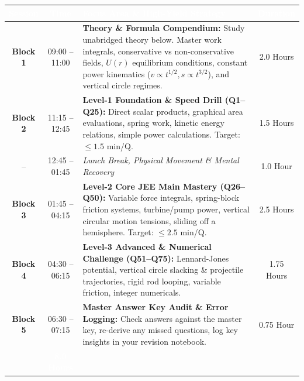 \documentclass[11pt,a4paper]{article}
\begin{document}
\begin{center}
\renewcommand{\arraystretch}{1.25}
\small
\begin{tabularx}{\textwidth}{|c|c|X|c|}
\hline
\rowcolor{tableDarkHeader}
\textcolor{white}{\textbf{Session}} & \textcolor{white}{\textbf{Time}} & \textcolor{white}{\textbf{Focus Area \& High-Yield Strategy}} & \textcolor{white}{\textbf{Duration}} \\
\hline
\rowcolor{white}
\textbf{Block 1} & 09:00 -- 11:00 & \textbf{Theory \& Formula Compendium:} Study unabridged theory below. Master work integrals, conservative vs non-conservative fields, $U(r)$ equilibrium conditions, constant power kinematics ($v \propto t^{1/2}, s \propto t^{3/2}$), and vertical circle regimes. & 2.0 Hours \\
\hline
\rowcolor{tableStripe}
\textbf{Block 2} & 11:15 -- 12:45 & \textbf{Level-1 Foundation \& Speed Drill (Q1--Q25):} Direct scalar products, graphical area evaluations, spring work, kinetic energy relations, simple power calculations. Target: $\le 1.5$ min/Q. & 1.5 Hours \\
\hline
\rowcolor{white}
-- & 12:45 -- 01:45 & \textit{Lunch Break, Physical Movement \& Mental Recovery} & 1.0 Hour \\
\hline
\rowcolor{tableStripe}
\textbf{Block 3} & 01:45 -- 04:15 & \textbf{Level-2 Core JEE Main Mastery (Q26--Q50):} Variable force integrals, spring-block friction systems, turbine/pump power, vertical circular motion tensions, sliding off a hemisphere. Target: $\le 2.5$ min/Q. & 2.5 Hours \\
\hline
\rowcolor{white}
\textbf{Block 4} & 04:30 -- 06:15 & \textbf{Level-3 Advanced \& Numerical Challenge (Q51--Q75):} Lennard-Jones potential, vertical circle slacking \& projectile trajectories, rigid rod looping, variable friction, integer numericals. & 1.75 Hours \\
\hline
\rowcolor{tableStripe}
\textbf{Block 5} & 06:30 -- 07:15 & \textbf{Master Answer Key Audit \& Error Logging:} Check answers against the master key, re-derive any missed questions, log key insights in your revision notebook. & 0.75 Hour \\
\hline
\rowcolor{tableDarkHeader}
\multicolumn{3}{|r|}{\textcolor{white}{\textbf{TOTAL DEDICATED STUDY TIME}}} & \textcolor{white}{\textbf{8.0 Hours}} \\
\hline
\end{tabularx}
\end{center}

\vspace{5pt}
\end{document}
